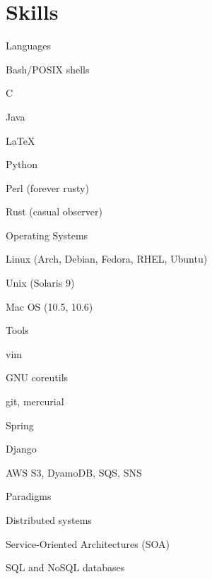 \documentclass[10pt]{barag_resume}
\begin{document}
\section{Skills}\relax
    \vspace{-2em} %
    \begin{multicols}{2}
        \begin{csitemize}{Languages}
            \item Bash/POSIX shells
            \item C
            \item Java
            \item \textrm{\LaTeX}
            \item Python
            \item Perl (forever rusty)
            \item Rust (casual observer)
        \end{csitemize}

        \begin{csitemize}{Operating Systems}
            \item Linux (Arch, Debian, Fedora, RHEL, Ubuntu)
            \item Unix (Solaris 9)
            \item Mac OS (10.5, 10.6)
        \end{csitemize}

        \begin{csitemize}{Tools}
            \item vim
            \item GNU coreutils
            \item git, mercurial
            \item Spring
            \item Django
            \item AWS S3, DyamoDB, SQS, SNS
        \end{csitemize}

        \begin{csitemize}{Paradigms}
            \item Distributed systems
            \item Service-Oriented Architectures (SOA)
            \item SQL and NoSQL databases
        \end{csitemize}
    \end{multicols}
\end{document}

